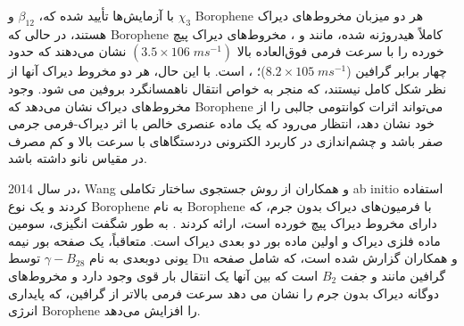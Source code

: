 با آزمایش‌ها تأیید شده که، \cite{fengDiracFermionsBorophene2017} $\beta_{12}$ و $\chi_3$ \gls{Borophene} هر دو میزبان مخروط‌های دیراک هستند، در حالی که \gls{Borophene} کاملاً هیدروژنه شده، مانند  و ، مخروط‌های دیراک پیچ خورده را با سرعت فرمی فوق‌العاده بالا $(3.5 \times 106\; m s^{-1})$ نشان می‌دهند که حدود چهار برابر گرافین ($8.2\times 105\; m s^{-1}$)؛ \cite{xuHydrogenatedBoropheneStable2016, hwangFermiVelocityEngineering2012, trevisanuttoInitioGWManyBody2008}، است. با این حال، هر دو مخروط دیراک آنها از نظر شکل کامل نیستند، که منجر به خواص انتقال ناهمسانگرد بروفین می شود. وجود مخروط‌های دیراک نشان می‌دهد که \gls{Borophene} می‌تواند اثرات کوانتومی جالبی را از خود نشان دهد، انتظار می‌رود که یک ماده عنصری خالص با اثر دیراک-فرمی جرمی صفر باشد \cite{malkoCompetitionGrapheneGraphynes2012, zhouSemimetallicTwoDimensionalBoron2014} و چشم‌اندازی در کاربرد الکترونی دردستگاهای با سرعت بالا و کم مصرف در مقیاس نانو داشته باشد.

در سال 2014، \gls{Wang} و همکاران \cite{zhouSemimetallicTwoDimensionalBoron2014} از روش جستجوی ساختار تکاملی \gls{ab initio} استفاده کردند و یک نوع \gls{Borophene} به نام  \gls{Borophene} با فرمیون‌های دیراک بدون جرم، که دارای مخروط دیراک پیچ خورده است، ارائه کردند \cite{li2018review}. به طور شگفت انگیزی،  سومین ماده فلزی دیراک و اولین ماده بور دو بعدی دیراک است. متعاقباً، یک صفحه بور نیمه یونی دوبعدی به نام $\gamma-B_{28}$ توسط \gls{Du} و همکاران گزارش شده است، \cite{maGraphenelikeTwoDimensionalIonic2016} که شامل صفحه گرافین مانند و جفت $B_2$ است که بین آنها یک انتقال بار قوی وجود دارد و مخروط‌های دوگانه دیراک بدون جرم را نشان می دهد سرعت فرمی بالاتر از گرافین، که پایداری انرژی \gls{Borophene}  را افزایش می‌دهد. 


